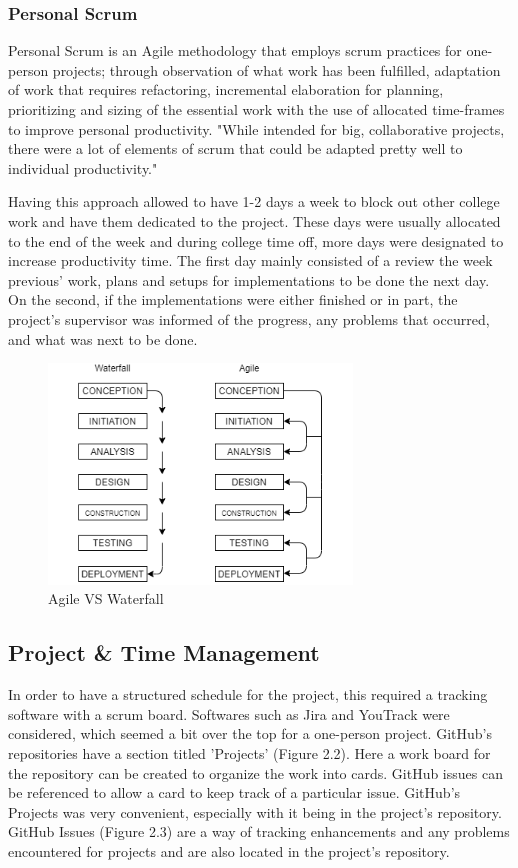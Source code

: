\subsubsection{Personal Scrum}
Personal Scrum is an Agile methodology that employs scrum practices for one-person projects; through observation of what work has been fulfilled, adaptation of work that requires refactoring, incremental elaboration for planning, prioritizing and sizing of the essential work with the use of allocated time-frames to improve personal productivity.
"While intended for big, collaborative projects, there were a lot of elements of scrum that could be adapted pretty well to individual productivity." \cite{ref4}
 
Having this approach allowed to have 1-2 days a week to block out other college work and have them dedicated to the project. These days were usually allocated to the end of the week and during college time off, more days were designated to increase productivity time. The first day mainly consisted of a review the week previous' work, plans and setups for implementations to be done the next day. On the second, if the implementations were either finished or in part, the project's supervisor was informed of the progress, any problems that occurred, and what was next to be done.

\begin{figure}[H]
    \caption{Agile VS Waterfall}
    \label{image:agileVSwaterfall}
    \centering
    \includegraphics[width=0.72\textwidth]{images/misc/agile-vs-waterfall.png}
\end{figure}

\subsection{Project \& Time Management}
In order to have a structured schedule for the project, this required a tracking software with a scrum board. Softwares such as Jira and YouTrack were considered, which seemed a bit over the top for a one-person project. GitHub's repositories have a section titled 'Projects' (Figure 2.2). Here a work board for the repository can be created to organize the work into cards. GitHub issues can be referenced to allow a card to keep track of a particular issue. GitHub's Projects was very convenient, especially with it being in the project's repository. GitHub Issues (Figure 2.3) are a way of tracking enhancements and any problems encountered for projects and are also located in the project's repository.

